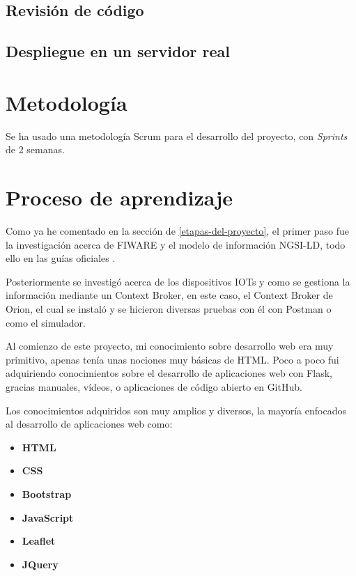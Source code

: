 \subsection{Revisión de código}


\subsection{Despliegue en un servidor real}



\section{Metodología}
Se ha usado una metodología Scrum para el desarrollo del proyecto, con \textit{Sprints} de 2 semanas.

\section{Proceso de aprendizaje}

Como ya he comentado en la sección de \ref{etapas-del-proyecto}, el primer paso fue la investigación acerca de FIWARE y el modelo de información NGSI-LD, todo ello en las guías oficiales \cite{fiware,fiware_ngsi_ld,etsi}. 

Posteriormente se investigó acerca de los dispositivos IOTs y como se gestiona la información mediante un Context Broker, en este caso, el Context Broker de Orion, el cual se instaló y se hicieron diversas pruebas con él con Postman o como el simulador.

Al comienzo de este proyecto, mi conocimiento sobre desarrollo web era muy primitivo, apenas tenía unas nociones muy básicas de HTML. Poco a poco fui adquiriendo conocimientos sobre el desarrollo de aplicaciones web con Flask, gracias manuales, vídeos, o aplicaciones de código abierto en GitHub.

Los conocimientos adquiridos son muy amplios y diversos, la mayoría enfocados al desarrollo de aplicaciones web como:
\begin{itemize}
    \item \textbf{HTML}
    \item \textbf{CSS}
    \item \textbf{Bootstrap}
    \item \textbf{JavaScript}
    \item \textbf{Leaflet}
    \item \textbf{JQuery}
\end{itemize}

